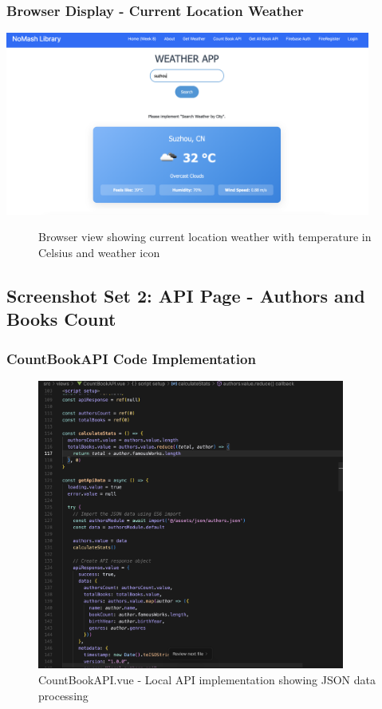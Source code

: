 \documentclass[12pt,a4paper]{article}
\begin{document}
\subsubsection{Browser Display - Current Location Weather}
\includegraphics[width=0.9\textwidth]{current_location_weather_browser.png}
\begin{figure}[H]
\centering
\caption{Browser view showing current location weather with temperature in Celsius and weather icon}
\end{figure}

\subsection{Screenshot Set 2: API Page - Authors and Books Count}

\subsubsection{CountBookAPI Code Implementation}
\begin{figure}[H]
\centering
\includegraphics[width=0.9\textwidth]{countbook_api_code.png}
\caption{CountBookAPI.vue - Local API implementation showing JSON data processing}
\end{figure}
\end{document}
